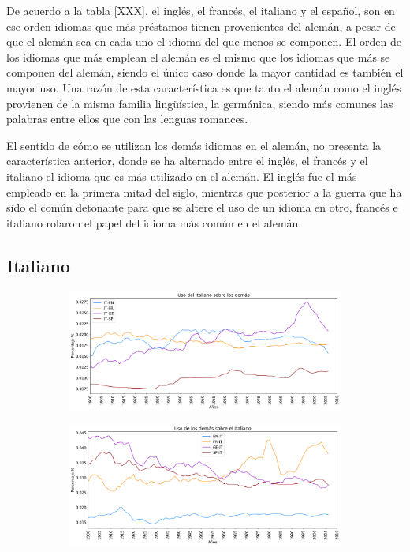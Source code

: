 De acuerdo a la tabla [XXX],  el inglés, el francés, el italiano y el español, son en ese orden idiomas que más préstamos tienen provenientes del alemán, a pesar de que el alemán sea en cada uno el idioma del que menos se componen.  El orden de los idiomas que más emplean el alemán es el mismo que los idiomas que más se componen del alemán, siendo el único caso donde la mayor cantidad es también el mayor uso. Una razón de esta característica es que tanto el alemán como el inglés provienen de la misma familia lingüística, la germánica,  siendo más comunes las palabras entre ellos  que con las lenguas romances.

El sentido de cómo se utilizan los demás idiomas en el alemán, no presenta la característica anterior,   donde se ha alternado entre el inglés, el francés y el italiano el idioma que es más utilizado en el alemán.  El inglés fue el más empleado en la primera mitad del siglo, mientras que posterior a la guerra que ha sido el común detonante para que se altere el uso de un idioma en otro,  francés e italiano rolaron el papel del idioma más común en el alemán. 


\newpage
\subsection{Italiano}

\begin{figure}[h!]
	
	\begin{subfigure}{}
		\centering
		\includegraphics[scale=.38]{Cap_3/PF1_S2_IT.png}
		\caption{}
		\label{fig:ST_IT_a}
	\end{subfigure}
	
	\begin{subfigure}{}
		\centering
		\includegraphics[scale=.38]{Cap_3/PF2_S2_IT.png}
		\caption{}
		\label{fig:ST_IT_b}
	\end{subfigure}
	
\end{figure}

